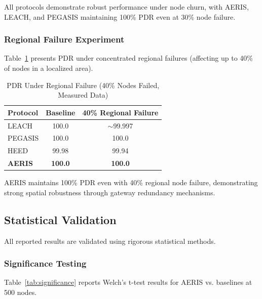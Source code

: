 All protocols demonstrate robust performance under node churn, with AERIS,
LEACH, and PEGASIS maintaining 100\% PDR even at 30\% node failure.

\subsubsection{Regional Failure Experiment}

Table~\ref{tab:regional_results} presents PDR under concentrated regional
failures (affecting up to 40\% of nodes in a localized area).

\begin{table}[htbp]
\centering
\caption{PDR Under Regional Failure (40\% Nodes Failed, Measured Data)}
\label{tab:regional_results}
\begin{tabular}{@{}lcc@{}}
\toprule
Protocol & Baseline & 40\% Regional Failure \\
\midrule
LEACH & 100.0 & $\sim$99.997 \\
PEGASIS & 100.0 & 100.0 \\
HEED & 99.98 & 99.94 \\
\textbf{AERIS} & \textbf{100.0} & \textbf{100.0} \\
\bottomrule
\end{tabular}
\end{table}

AERIS maintains 100\% PDR even with 40\% regional node failure, demonstrating
strong spatial robustness through gateway redundancy mechanisms.

\subsection{Statistical Validation}

All reported results are validated using rigorous statistical methods.

\subsubsection{Significance Testing}

Table~\ref{tab:significance} reports Welch's t-test results for
AERIS vs. baselines at 500 nodes.

